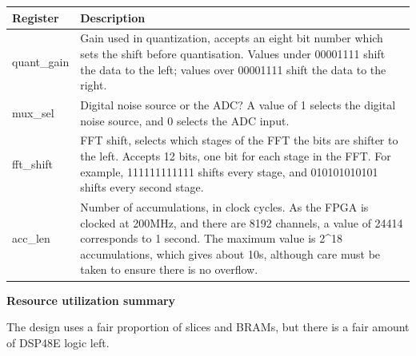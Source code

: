 \documentclass[letterpaper,10pt,english]{sphinxmanual}
\begin{document}
\begin{tabulary}{\linewidth}{|L|L|}
\hline
\textbf{
Register
} & \textbf{
Description
}\\\hline

quant\_gain
 & 
Gain used in quantization, accepts an eight bit
number which sets the shift before quantisation.
Values under 00001111 shift the data to the left;
values over  00001111 shift the data to the right.
\\\hline

mux\_sel
 & 
Digital noise source or the ADC? A value of 1 selects
the digital noise source, and 0 selects the ADC input.
\\\hline

fft\_shift
 & 
FFT shift, selects which stages of the FFT the bits are
shifter to the left. Accepts 12 bits, one bit for each
stage in the FFT. For example, 111111111111 shifts every
stage, and 010101010101 shifts every second stage.
\\\hline

acc\_len
 & 
Number of accumulations, in clock cycles. As the FPGA
is clocked at 200MHz, and there are 8192 channels, a
value of 24414 corresponds to 1 second. The maximum
value is 2\textasciicircum{}18 accumulations, which gives about 10s,
although care must be taken to ensure there is no overflow.
\\\hline
\end{tabulary}


\textbf{Resource utilization summary}

The design uses a fair proportion of slices and BRAMs, but there is a fair
amount of DSP48E logic left.
\end{document}
